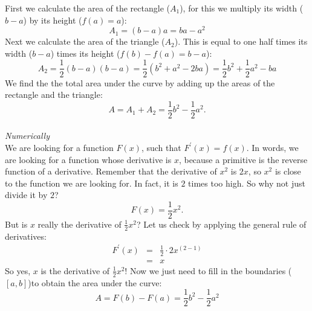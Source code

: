 \documentclass[a4paper]{report}
\begin{document}
\begin{mdframed}[backgroundcolor=exampcol]
First we calculate the area of the rectangle ($A_1$), for this we multiply its width ($b-a$) by its height ($f(a) = a$):
\begin{equation*}
A_1 = (b-a)a = ba - a^2
\end{equation*}
Next we calculate the area of the triangle ($A_2$). This is equal to one half times its width ($b-a$) times its height ($f(b)-f(a)=b-a$):
\begin{equation*}
A_2 = \frac{1}{2} (b-a)(b-a) = \frac{1}{2} \left(b^2 + a^2 - 2ba \right) = \frac{1}{2} b^2 + \frac{1}{2} a^2 - ba 
\end{equation*}
We find the the total area under the curve by adding up the areas of the rectangle and the triangle:
\begin{equation*}
A = A_1 + A_2 = \frac{1}{2} b^2 - \frac{1}{2} a^2.
\end{equation*}\\[0.5ex]
\noindent\textit{Numerically}\\
We are looking for a function $F(x)$, such that $F^\prime(x) = f(x)$. In words, we are looking for a function whose derivative is $x$, because a primitive is the reverse function of a derivative. Remember that the derivative of $x^2$ is $2x$, so $x^2$ is close to the function we are looking for. In fact, it is $2$ times too high. So why not just divide it by $2$?
\begin{equation*}
F(x) = \frac{1}{2} x^2.
\end{equation*}
But is $x$ really the derivative of $\frac{1}{2} x^2$? Let us check by applying the general rule of derivatives: 
\begin{eqnarray*}
F^\prime(x) &=& \frac{1}{2} \cdot 2 x^{(2-1)}\\
&=&x
\end{eqnarray*}
So yes,  $x$ is the derivative of $\frac{1}{2} x^2$!
Now we just need to fill in the boundaries ($\left[a,b\right]$)to obtain the area under the curve:
\begin{equation*}
A = F(b) - F(a) = \frac{1}{2} b^2 - \frac{1}{2} a^2
\end{equation*}
\end{mdframed}
\end{document}
